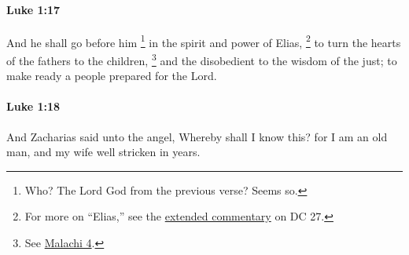 		\paragraph{Luke 1:17} %
			\label{LUKE-1-17}

			And he shall go before him%
				\footnote{%
					Who? The Lord God from the previous verse? Seems so.
					}
			in the spirit and power of Elias,%
				\footnote{%
					For more on ``Elias,'' see the \hyperref[EXSS-DC27-JSR]{extended commentary} on DC 27.
					}
			to turn the hearts of the fathers to the children,%
				\footnote{%
					See \hyperref[MALACHI-4]{Malachi 4}.
					}
			and the disobedient to the wisdom of the just; to make ready a people prepared for the Lord.

			\begin{framed}
			\scriptsize
				\begin{compactdesc}
					\item[SBLG] 
				\end{compactdesc}
			\end{framed}

		\paragraph{Luke 1:18} %
			\label{LUKE-1-18}

			And Zacharias said unto the angel, Whereby shall I know this? for I am an old man, and my wife well stricken in years.

